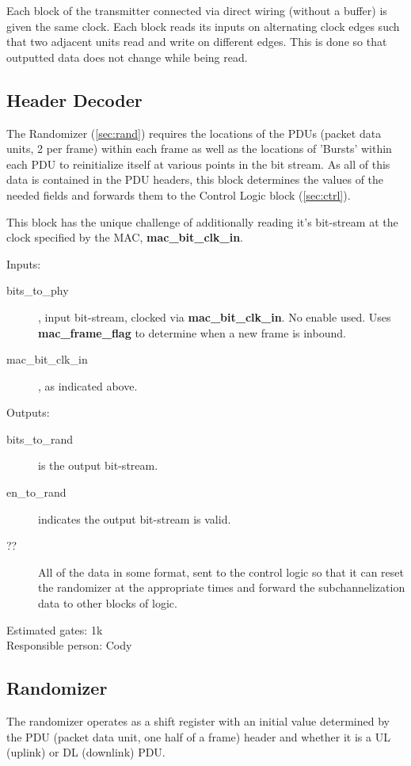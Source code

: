 \documentclass[dvips,10pt,twocolumn]{article}
\begin{document}
Each block of the transmitter connected via direct wiring (without a
buffer) is given the same clock. Each block reads its inputs on alternating
clock edges such that two adjacent units read and write on different edges.
This is done so that outputted data does not change while being read.

	\subsection{Header Decoder}
	\label{sec:header}
	The Randomizer (\autoref{sec:rand}) requires the locations of the
	PDUs (packet data units, 2 per frame) within each frame as well as
	the locations of 'Bursts' within each PDU to reinitialize itself at
	various points in the bit stream. As all of this data is contained
	in the PDU headers, this block determines the values of the needed
	fields and forwards them to the Control Logic block
	(\autoref{sec:ctrl}). 

	This block has the unique challenge of additionally reading it's
	bit-stream at the clock specified by the MAC,
	\textbf{mac\_bit\_clk\_in}.

	\begin{description}
		\item{Inputs:} \begin{description}
			\item[bits\_to\_phy], input bit-stream,  clocked via
				\textbf{mac\_bit\_clk\_in}.  No enable
				used. Uses \textbf{mac\_frame\_flag} to
				determine when a new frame is inbound.
			\item[mac\_bit\_clk\_in], as indicated above.
		\end{description}
		\item{Outputs:} \begin{description}
			\item[bits\_to\_rand] is the output bit-stream.
			\item[en\_to\_rand] indicates the output bit-stream
				is valid.
			\item[??] All of the data in some format, sent to
				the control logic so that it can reset the
				randomizer at the appropriate times and
				forward the subchannelization data to other
				blocks of logic.
		\end{description}
	\end{description}

	Estimated gates: 1k \\
	Responsible person: Cody

	\subsection{Randomizer}
	\label{sec:rand}
	The randomizer operates as a shift register with an initial value
	determined by the PDU (packet data unit, one half of a frame) header
	and whether it is a UL (uplink) or DL (downlink) PDU.
\end{document}
